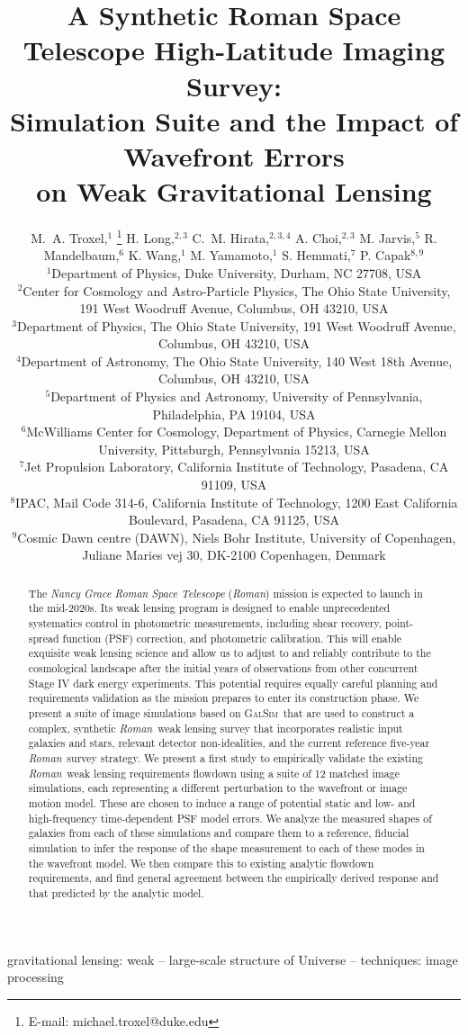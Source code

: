 \documentclass[usenatbib]{mnras}
\title[A Synthetic Roman High-Latitude Imaging Survey]{A Synthetic Roman Space Telescope High-Latitude Imaging Survey: \\
Simulation Suite and the Impact of Wavefront Errors \\on Weak Gravitational Lensing}
\author[M.~A. Troxel et al.]{M.~A. Troxel,$^1$ \thanks{E-mail: michael.troxel@duke.edu}
H. Long,$^{2,3}$
C.~M. Hirata,$^{2,3,4}$
A. Choi,$^{2,3}$
M. Jarvis,$^5$
R. Mandelbaum,$^6$
\newauthor
K. Wang,$^1$
M. Yamamoto,$^1$
S. Hemmati,$^7$
P. Capak$^{8,9}$\\
$^{1}$Department of Physics, Duke University, Durham, NC 27708, USA\\
$^{2}$Center for Cosmology and Astro-Particle Physics, The Ohio State University, 191 West Woodruff Avenue, Columbus, OH 43210, USA\\
$^{3}$Department of Physics, The Ohio State University, 191 West Woodruff Avenue, Columbus, OH 43210, USA\\
$^{4}$Department of Astronomy, The Ohio State University, 140 West 18th Avenue, Columbus, OH 43210, USA\\
$^{5}$Department of Physics and Astronomy, University of Pennsylvania, Philadelphia, PA 19104, USA\\
$^{6}$McWilliams Center for Cosmology, Department of Physics, Carnegie Mellon University, Pittsburgh, Pennsylvania 15213, USA\\
$^{7}$Jet Propulsion Laboratory, California Institute of Technology, Pasadena, CA 91109, USA\\
$^{8}$IPAC, Mail Code 314-6, California Institute of Technology, 1200 East California Boulevard, Pasadena, CA 91125, USA\\
$^{9}$Cosmic Dawn centre (DAWN), Niels Bohr Institute, University of Copenhagen, Juliane Maries vej 30, DK-2100 Copenhagen, Denmark
}
\newcommand{\galsim}{\textsc{GalSim}}
\newcommand{\wfirst}{{\slshape Roman}}
\begin{document}
\label{firstpage}
\pagerange{\pageref{firstpage}--\pageref{lastpage}}
\maketitle

\begin{abstract}
The {\slshape Nancy Grace Roman Space Telescope} (\wfirst) mission is expected to launch in the mid-2020s. Its weak lensing program is designed to enable unprecedented systematics control in photometric measurements, including shear recovery, point-spread function (PSF) correction, and photometric calibration. This will enable exquisite weak lensing science and allow us to adjust to and reliably contribute to the cosmological landscape after the initial years of observations from other concurrent Stage IV dark energy experiments. This potential requires equally careful planning and requirements validation as the mission prepares to enter its construction phase. We present a suite of image simulations based on \galsim\ that are used to construct a complex, synthetic \wfirst\ weak lensing survey that incorporates realistic input galaxies and stars, relevant detector non-idealities, and the current reference five-year \wfirst\ survey strategy. We present a first study to empirically validate the existing \wfirst\ weak lensing requirements flowdown using a suite of 12 matched image simulations, each representing a different perturbation to the wavefront or image motion model. These are chosen to induce a range of potential static and low- and high-frequency time-dependent PSF model errors. We analyze the measured shapes of galaxies from each of these simulations and compare them to a reference, fiducial simulation to infer the response of the shape measurement to each of these modes in the wavefront model. We then compare this to existing analytic flowdown requirements, and find general agreement between the empirically derived response and that predicted by the analytic model.
\end{abstract}

\begin{keywords}
gravitational lensing: weak -- large-scale structure of Universe -- techniques: image processing
\end{keywords}

\maketitle
\end{document}
